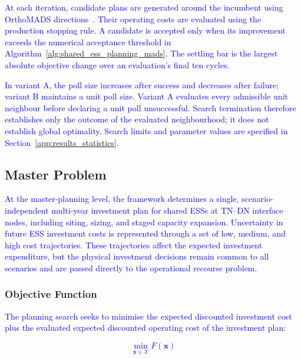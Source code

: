 \documentclass[preprint,12pt]{elsarticle}
\begin{document}
\textcolor{blue}{
    At each iteration, candidate plans are generated around the incumbent using OrthoMADS directions~\cite{abramson_orthomads_2009}.
    Their operating costs are evaluated using the production stopping rule. A candidate is accepted only when its improvement exceeds the numerical acceptance threshold in Algorithm~\ref{alg:shared_ess_planning_mads}. The settling bar is the largest absolute objective change over an evaluation's final ten cycles.
}

\textcolor{blue}{
    In variant A, the poll size increases after success and decreases after failure; variant B maintains a unit poll size.
    Variant A evaluates every admissible unit neighbour before declaring a unit poll unsuccessful. Search termination therefore establishes only the outcome of the evaluated neighbourhood; it does not establish global optimality. Search limits and parameter values are specified in Section~\ref{app:results_statistics}.
}

\subsection{Master Problem}
\label{subsec:master}

\textcolor{blue}{At the master-planning level, the framework determines a single, scenario-independent multi-year investment plan for shared ESSs at TN–DN interface nodes, including siting, sizing, and staged capacity expansion. Uncertainty in future ESS investment costs is represented through a set of low, medium, and high cost trajectories. These trajectories affect the expected investment expenditure, but the physical investment decisions remain common to all scenarios and are passed directly to the operational recourse problem.}

\subsubsection{Objective Function}

\textcolor{blue}{The planning search seeks to minimise the expected discounted investment cost plus the evaluated expected discounted operating cost of the investment plan:}

\textcolor{blue}{
    \begin{equation}
        \min_{\boldsymbol{x}\in\mathcal{X}} F(\boldsymbol{x})
        \label{eq:master_objective}
    \end{equation}
}
\end{document}
